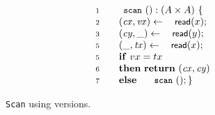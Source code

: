 \begin{wrapfigure}[11]{t}[15pt]{0.5\textwidth} 
\vspace{-15pt}
%
% 
\begin{minipage}[t]{.5\textwidth}
\[
\begin{array}{rl}
\num{1} & \esc{scan}\ () : ( A \times A )~ \{ \\ 
\num{2} & ~~~ (\var{cx}, \var{vx}) \tbnd \act{read}(\x);\\
\num{3} & ~~~ (\var{cy}, \_ ) \tbnd \act{read}(\y);\\
\num{5} & ~~~ (\_ , \var{tx}) \tbnd \act{read}(\x);\\
\num{5} & ~~~ \kw{if}\ vx = tx \\
\num{6} & ~~~ \kw{then}\ \kw{return}\ (\var{cx},\var{cy})\\
\num{7} & ~~~ \kw{else}\ \esc{scan}\ (); \}
\end{array}
\]
\end{minipage}
%
%
\caption{{\tt Scan} using versions.}
\label{fig:readpair}
\end{wrapfigure}

